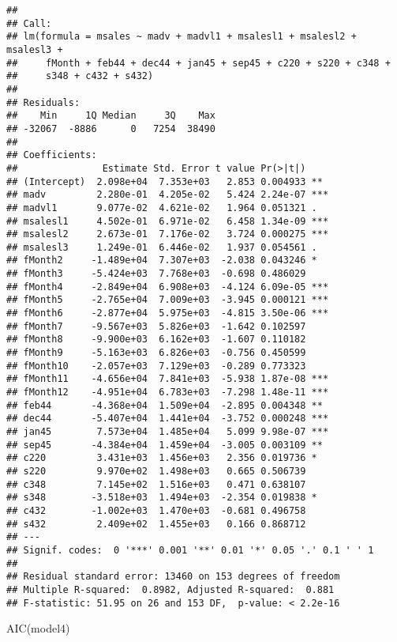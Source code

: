 \documentclass[
]{article}
\newenvironment{Shaded}{\begin{snugshade}}{\end{snugshade}}
\newcommand{\FunctionTok}[1]{\textcolor[rgb]{0.00,0.00,0.00}{#1}}
\newcommand{\NormalTok}[1]{#1}
\begin{document}
\begin{verbatim}
## 
## Call:
## lm(formula = msales ~ madv + madvl1 + msalesl1 + msalesl2 + msalesl3 + 
##     fMonth + feb44 + dec44 + jan45 + sep45 + c220 + s220 + c348 + 
##     s348 + c432 + s432)
## 
## Residuals:
##    Min     1Q Median     3Q    Max 
## -32067  -8886      0   7254  38490 
## 
## Coefficients:
##               Estimate Std. Error t value Pr(>|t|)    
## (Intercept)  2.098e+04  7.353e+03   2.853 0.004933 ** 
## madv         2.280e-01  4.205e-02   5.424 2.24e-07 ***
## madvl1       9.077e-02  4.621e-02   1.964 0.051321 .  
## msalesl1     4.502e-01  6.971e-02   6.458 1.34e-09 ***
## msalesl2     2.673e-01  7.176e-02   3.724 0.000275 ***
## msalesl3     1.249e-01  6.446e-02   1.937 0.054561 .  
## fMonth2     -1.489e+04  7.307e+03  -2.038 0.043246 *  
## fMonth3     -5.424e+03  7.768e+03  -0.698 0.486029    
## fMonth4     -2.849e+04  6.908e+03  -4.124 6.09e-05 ***
## fMonth5     -2.765e+04  7.009e+03  -3.945 0.000121 ***
## fMonth6     -2.877e+04  5.975e+03  -4.815 3.50e-06 ***
## fMonth7     -9.567e+03  5.826e+03  -1.642 0.102597    
## fMonth8     -9.900e+03  6.162e+03  -1.607 0.110182    
## fMonth9     -5.163e+03  6.826e+03  -0.756 0.450599    
## fMonth10    -2.057e+03  7.129e+03  -0.289 0.773323    
## fMonth11    -4.656e+04  7.841e+03  -5.938 1.87e-08 ***
## fMonth12    -4.951e+04  6.783e+03  -7.298 1.48e-11 ***
## feb44       -4.368e+04  1.509e+04  -2.895 0.004348 ** 
## dec44       -5.407e+04  1.441e+04  -3.752 0.000248 ***
## jan45        7.573e+04  1.485e+04   5.099 9.98e-07 ***
## sep45       -4.384e+04  1.459e+04  -3.005 0.003109 ** 
## c220         3.431e+03  1.456e+03   2.356 0.019736 *  
## s220         9.970e+02  1.498e+03   0.665 0.506739    
## c348         7.145e+02  1.516e+03   0.471 0.638107    
## s348        -3.518e+03  1.494e+03  -2.354 0.019838 *  
## c432        -1.002e+03  1.470e+03  -0.681 0.496758    
## s432         2.409e+02  1.455e+03   0.166 0.868712    
## ---
## Signif. codes:  0 '***' 0.001 '**' 0.01 '*' 0.05 '.' 0.1 ' ' 1
## 
## Residual standard error: 13460 on 153 degrees of freedom
## Multiple R-squared:  0.8982, Adjusted R-squared:  0.881 
## F-statistic: 51.95 on 26 and 153 DF,  p-value: < 2.2e-16
\end{verbatim}

\begin{Shaded}
\begin{Highlighting}[]
\FunctionTok{AIC}\NormalTok{(model4)}
\end{Highlighting}
\end{Shaded}
\end{document}
